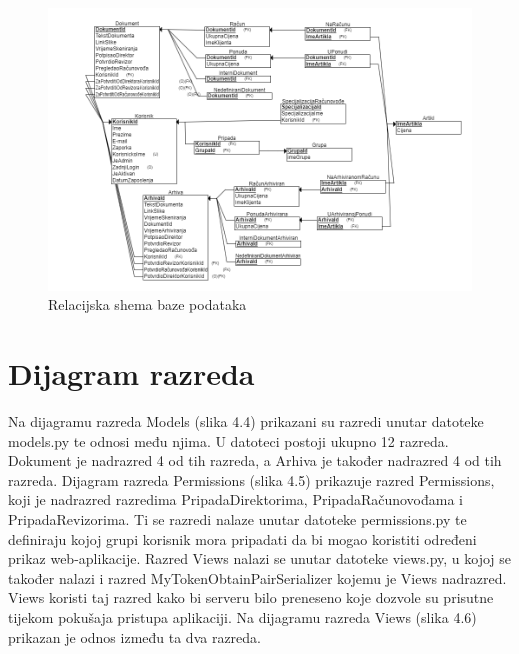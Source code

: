 			\begin{figure}[H]
				\includegraphics[width=\textwidth]{slike/Relacijska_shema.png} %
				\caption{Relacijska shema baze podataka}
				\label{fig:relacijska_shema} %
			\end{figure}

			\eject
			
			
		\section{Dijagram razreda}
		
			Na dijagramu razreda Models (slika 4.4) prikazani su razredi unutar datoteke models.py te
			odnosi među njima. U datoteci postoji ukupno 12 razreda. Dokument je nadrazred 4 od tih razreda, a Arhiva
			je također nadrazred 4 od tih razreda.
			\newline
			Dijagram razreda Permissions (slika 4.5) prikazuje razred Permissions,
			koji je nadrazred razredima PripadaDirektorima, PripadaRačunovođama i PripadaRevizorima. Ti se
			razredi nalaze unutar datoteke permissions.py te definiraju kojoj grupi korisnik mora pripadati
			da bi mogao koristiti određeni prikaz web-aplikacije.
			\newline
			Razred Views nalazi se unutar datoteke views.py, u kojoj se također nalazi i razred
			MyTokenObtainPairSerializer kojemu je Views nadrazred. Views koristi taj razred kako bi
			serveru bilo preneseno koje dozvole su prisutne tijekom pokušaja pristupa aplikaciji.
			Na dijagramu razreda Views (slika 4.6) prikazan je odnos između ta dva razreda. 
			
